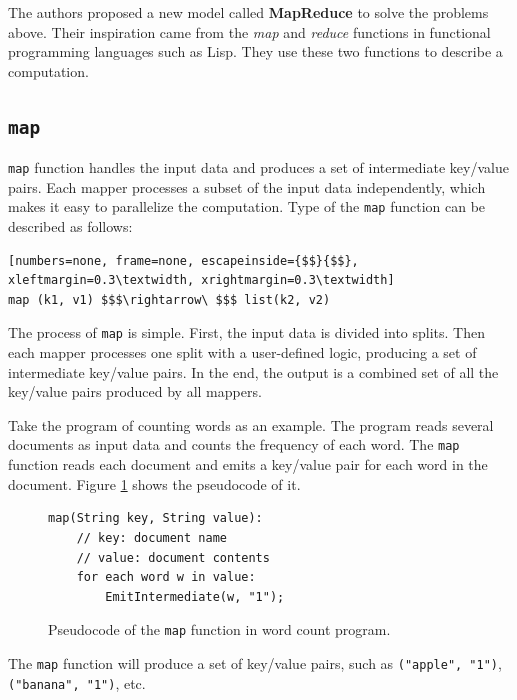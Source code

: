 \documentclass[10pt]{article}
\begin{document}
The authors proposed a new model called \textbf{MapReduce} to solve the problems above. 
Their inspiration came from the \textit{map} and \textit{reduce} functions in functional programming languages such as Lisp.
They use these two functions to describe a computation.

\subsection{\texttt{map}}

\texttt{map} function handles the input data and produces a set of intermediate key/value pairs. Each mapper processes a subset of the input data independently, which makes it easy to parallelize the computation. Type of the \texttt{map} function can be described as follows:

\begin{lstlisting}[numbers=none, frame=none, escapeinside={$$}{$$}, xleftmargin=0.3\textwidth, xrightmargin=0.3\textwidth]
map (k1, v1) $$$\rightarrow\ $$$ list(k2, v2)
\end{lstlisting}

The process of \texttt{map} is simple.
First, the input data is divided into splits.
Then each mapper processes one split with a user-defined logic, producing a set of intermediate key/value pairs.
In the end, the output is a combined set of all the key/value pairs produced by all mappers.

Take the program of counting words as an example. 
The program reads several documents as input data and counts the frequency of each word.
The \texttt{map} function reads each document and emits a key/value pair for each word in the document.
Figure \ref{fig:map} shows the pseudocode of it.

\begin{figure}[H]
\centering

\begin{lstlisting}[xleftmargin=0.3\textwidth, xrightmargin=0.3\textwidth]
map(String key, String value):
    // key: document name
    // value: document contents
    for each word w in value:
        EmitIntermediate(w, "1");
\end{lstlisting}
\caption{Pseudocode of the \texttt{map} function in word count program.}
\label{fig:map}
\end{figure}

The \texttt{map} function will produce a set of key/value pairs, such as \texttt{("apple", "1")}, \texttt{("banana", "1")}, etc.
\end{document}
